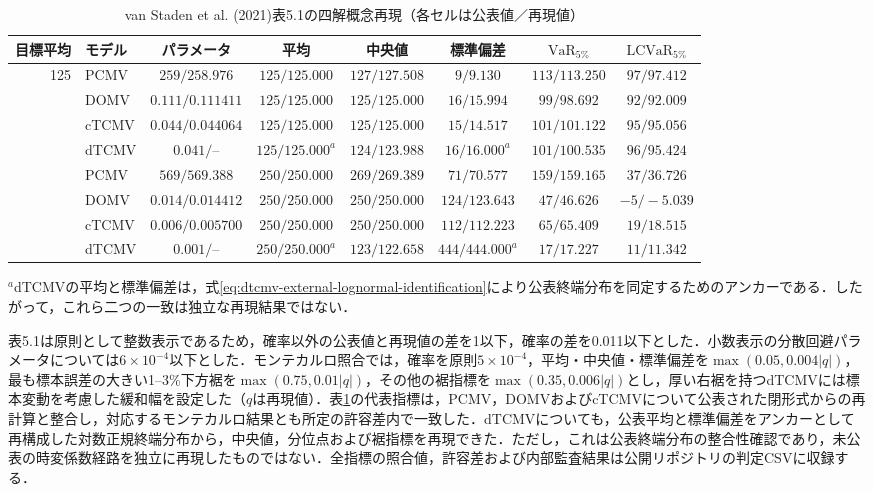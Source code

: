\documentclass[10pt,a4paper]{article}
\theoremstyle{plain}
\theoremstyle{definition}
\DeclareMathOperator{\VaR}{VaR}
\begin{document}
\begin{table}[htbp]
\centering
\caption{van Staden et al. (2021)表5.1の四解概念再現（各セルは公表値／再現値）}
\label{tab:vanstaden-all-mv-validation}
\scriptsize
\setlength{\tabcolsep}{3.3pt}
\begin{tabular}{@{}rlcccccc@{}}
\toprule
目標平均 & モデル & パラメータ & 平均 & 中央値 & 標準偏差 & $\VaR_{5\%}$ & $\mathrm{LCVaR}_{5\%}$ \\
\midrule
125 & PCMV  & $259/258.976$ & $125/125.000$ & $127/127.508$ & $9/9.130$ & $113/113.250$ & $97/97.412$ \\
    & DOMV  & $0.111/0.111411$ & $125/125.000$ & $125/125.000$ & $16/15.994$ & $99/98.692$ & $92/92.009$ \\
    & cTCMV & $0.044/0.044064$ & $125/125.000$ & $125/125.000$ & $15/14.517$ & $101/101.122$ & $95/95.056$ \\
    & dTCMV & $0.041/\text{--}$ & $125/125.000^{a}$ & $124/123.988$ & $16/16.000^{a}$ & $101/100.535$ & $96/95.424$ \\
\addlinespace
250 & PCMV  & $569/569.388$ & $250/250.000$ & $269/269.389$ & $71/70.577$ & $159/159.165$ & $37/36.726$ \\
    & DOMV  & $0.014/0.014412$ & $250/250.000$ & $250/250.000$ & $124/123.643$ & $47/46.626$ & $-5/-5.039$ \\
    & cTCMV & $0.006/0.005700$ & $250/250.000$ & $250/250.000$ & $112/112.223$ & $65/65.409$ & $19/18.515$ \\
    & dTCMV & $0.001/\text{--}$ & $250/250.000^{a}$ & $123/122.658$ & $444/444.000^{a}$ & $17/17.227$ & $11/11.342$ \\
\bottomrule
\end{tabular}
\begin{minipage}{0.98\textwidth}\vspace{2pt}\scriptsize
$^{a}$dTCMVの平均と標準偏差は，式\eqref{eq:dtcmv-external-lognormal-identification}により公表終端分布を同定するためのアンカーである．したがって，これら二つの一致は独立な再現結果ではない．
\end{minipage}
\end{table}

表5.1は原則として整数表示であるため，確率以外の公表値と再現値の差を1以下，確率の差を0.011以下とした．小数表示の分散回避パラメータについては$6\times10^{-4}$以下とした．モンテカルロ照合では，確率を原則$5\times10^{-4}$，平均・中央値・標準偏差を$\max(0.05,0.004|q|)$，最も標本誤差の大きい1--3\%下方裾を$\max(0.75,0.01|q|)$，その他の裾指標を$\max(0.35,0.006|q|)$とし，厚い右裾を持つdTCMVには標本変動を考慮した緩和幅を設定した（$q$は再現値）．表\ref{tab:vanstaden-all-mv-validation}の代表指標は，PCMV，DOMVおよびcTCMVについて公表された閉形式からの再計算と整合し，対応するモンテカルロ結果とも所定の許容差内で一致した．dTCMVについても，公表平均と標準偏差をアンカーとして再構成した対数正規終端分布から，中央値，分位点および裾指標を再現できた．ただし，これは公表終端分布の整合性確認であり，未公表の時変係数経路を独立に再現したものではない．全指標の照合値，許容差および内部監査結果は公開リポジトリの判定CSVに収録する．
\end{document}
